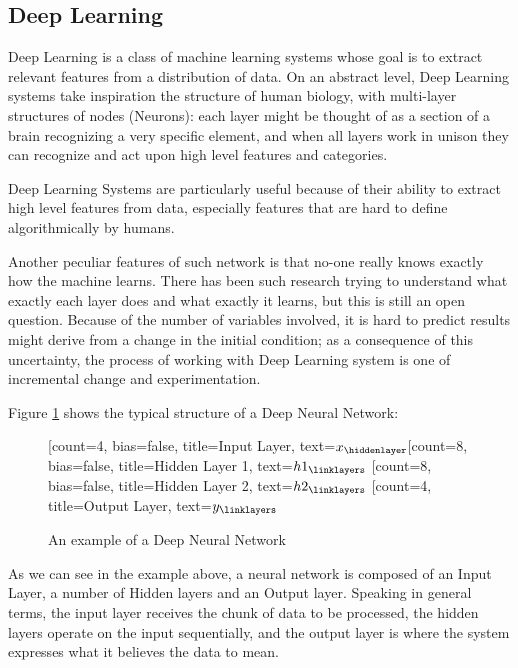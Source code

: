 \subsection{Deep Learning}
Deep Learning is a class of machine learning systems whose goal is to extract relevant features from a distribution of data. On an abstract level, Deep Learning systems take inspiration the structure of human biology, with multi-layer structures of nodes (Neurons): each layer might be thought of as a section of a brain recognizing a very specific element, and when all layers work in unison they can recognize and act upon high level features and categories.


Deep Learning Systems are particularly useful because of their ability to extract high level features from data, especially features that are hard to define algorithmically by humans.

Another peculiar features of such network is that no-one really knows exactly how the machine learns. There has been such research trying to understand what exactly each layer does and what exactly it learns, but this is still an open question.\newline %
Because of the number of variables involved, it is hard to predict results might derive from a change in the initial condition; as a consequence of this uncertainty, the process of working with Deep Learning system is one of incremental change and experimentation. 

Figure \ref{fig:DNN} shows the typical structure of a Deep Neural Network:
\begin{figure}[H]
\centering    
\begin{neuralnetwork}[height=8]
\newcommand{\x}[2]{$x_#2$}
\newcommand{\y}[2]{$y_#2$}
\newcommand{\hfirst}[2]{\small $h1_#2$}
\newcommand{\hsecond}[2]{\small $h2_#2$}
[count=4, bias=false, title=Input Layer, text=\x]
\hiddenlayer[count=8, bias=false, title=Hidden Layer 1, text=\hfirst] \linklayers
\hiddenlayer[count=8, bias=false, title=Hidden Layer 2, text=\hsecond] \linklayers
\outputlayer[count=4, title=Output Layer, text=\y] \linklayers
\end{neuralnetwork}
\caption{An example of a Deep Neural Network}\label{fig:DNN}
\end{figure}
As we can see in the example above, a neural network is composed of an Input Layer, a number of Hidden layers and an Output layer.
Speaking in general terms, the input layer receives the chunk of data to be processed, the hidden layers operate on the input sequentially, and the output layer is where the system expresses what it believes the data to mean.

